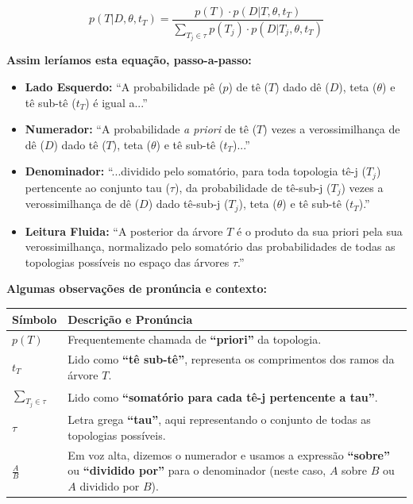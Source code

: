 $$p(T|D, \theta, t_T) = \frac{p(T) \cdot p(D|T, \theta, t_T)}{\sum_{T_j \in \tau} p(T_j) \cdot p(D|T_j, \theta, t_T)}$$

\textbf{Assim leríamos esta equação, passo-a-passo:}

\begin{itemize}
    \item \textbf{Lado Esquerdo:} ``A probabilidade pê ($p$) de tê ($T$) dado dê ($D$), teta ($\theta$) e tê sub-tê ($t_T$) é igual a...''
    \item \textbf{Numerador:} ``A probabilidade \textit{a priori} de tê ($T$) vezes a verossimilhança de dê ($D$) dado tê ($T$), teta ($\theta$) e tê sub-tê ($t_T$)...''
    \item \textbf{Denominador:} ``...dividido pelo somatório, para toda topologia tê-j ($T_j$) pertencente ao conjunto tau ($\tau$), da probabilidade de tê-sub-j ($T_j$) vezes a verossimilhança de dê ($D$) dado tê-sub-j ($T_j$), teta ($\theta$) e tê sub-tê ($t_T$).''
    \item \textbf{Leitura Fluida:} ``A posterior da árvore $T$ é o produto da sua priori pela sua verossimilhança, normalizado pelo somatório das probabilidades de todas as topologias possíveis no espaço das árvores $\tau$.''
\end{itemize}

\vspace{0.5cm}

\textbf{Algumas observações de pronúncia e contexto:}

\begin{center}
\renewcommand{\arraystretch}{1.5}
\begin{tabular}{lp{10cm}}
\hline
\textbf{Símbolo} & \textbf{Descrição e Pronúncia} \\ \hline
$p(T)$ & Frequentemente chamada de \textbf{``priori''} da topologia. \\
$t_T$ & Lido como \textbf{``tê sub-tê''}, representa os comprimentos dos ramos da árvore $T$. \\
$\sum_{T_j \in \tau}$ & Lido como \textbf{``somatório para cada tê-j pertencente a tau''}. \\
$\tau$ & Letra grega \textbf{``tau''}, aqui representando o conjunto de todas as topologias possíveis. \\
$\frac{A}{B}$ & Em voz alta, dizemos o numerador e usamos a expressão \textbf{``sobre''} ou \textbf{``dividido por''} para o denominador (neste caso, $A$ sobre $B$ ou $A$ dividido por $B$). \\ \hline
\end{tabular}
\end{center}

